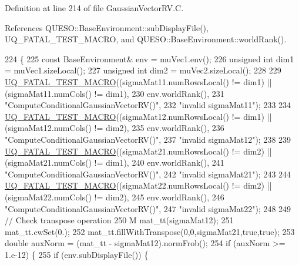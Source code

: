 Definition at line 214 of file Gaussian\-Vector\-R\-V.\-C.



References Q\-U\-E\-S\-O\-::\-Base\-Environment\-::sub\-Display\-File(), U\-Q\-\_\-\-F\-A\-T\-A\-L\-\_\-\-T\-E\-S\-T\-\_\-\-M\-A\-C\-R\-O, and Q\-U\-E\-S\-O\-::\-Base\-Environment\-::world\-Rank().


\begin{DoxyCode}
224 \{
225   \textcolor{keyword}{const} BaseEnvironment& env = muVec1.env();
226   \textcolor{keywordtype}{unsigned} \textcolor{keywordtype}{int} dim1 = muVec1.sizeLocal();
227   \textcolor{keywordtype}{unsigned} \textcolor{keywordtype}{int} dim2 = muVec2.sizeLocal();
228 
229   \hyperlink{_defines_8h_a56d63d18d0a6d45757de47fcc06f574d}{UQ\_FATAL\_TEST\_MACRO}((sigmaMat11.numRowsLocal() != dim1) || (sigmaMat11.numCols() != 
      dim1),
230                       env.worldRank(),
231                       \textcolor{stringliteral}{"ComputeConditionalGaussianVectorRV()"},
232                       \textcolor{stringliteral}{"invalid sigmaMat11"});
233 
234   \hyperlink{_defines_8h_a56d63d18d0a6d45757de47fcc06f574d}{UQ\_FATAL\_TEST\_MACRO}((sigmaMat12.numRowsLocal() != dim1) || (sigmaMat12.numCols() != 
      dim2),
235                       env.worldRank(),
236                       \textcolor{stringliteral}{"ComputeConditionalGaussianVectorRV()"},
237                       \textcolor{stringliteral}{"invalid sigmaMat12"});
238 
239   \hyperlink{_defines_8h_a56d63d18d0a6d45757de47fcc06f574d}{UQ\_FATAL\_TEST\_MACRO}((sigmaMat21.numRowsLocal() != dim2) || (sigmaMat21.numCols() != 
      dim1),
240                       env.worldRank(),
241                       \textcolor{stringliteral}{"ComputeConditionalGaussianVectorRV()"},
242                       \textcolor{stringliteral}{"invalid sigmaMat21"});
243 
244   \hyperlink{_defines_8h_a56d63d18d0a6d45757de47fcc06f574d}{UQ\_FATAL\_TEST\_MACRO}((sigmaMat22.numRowsLocal() != dim2) || (sigmaMat22.numCols() != 
      dim2),
245                       env.worldRank(),
246                       \textcolor{stringliteral}{"ComputeConditionalGaussianVectorRV()"},
247                       \textcolor{stringliteral}{"invalid sigmaMat22"});
248 
249   \textcolor{comment}{// Check transpose operation}
250   M mat\_tt(sigmaMat12);
251   mat\_tt.cwSet(0.);
252   mat\_tt.fillWithTranspose(0,0,sigmaMat21,\textcolor{keyword}{true},\textcolor{keyword}{true});
253   \textcolor{keywordtype}{double} auxNorm = (mat\_tt - sigmaMat12).normFrob();
254   \textcolor{keywordflow}{if} (auxNorm >= 1.e-12) \{
255     \textcolor{keywordflow}{if} (env.subDisplayFile()) \{

\end{DoxyCode}
